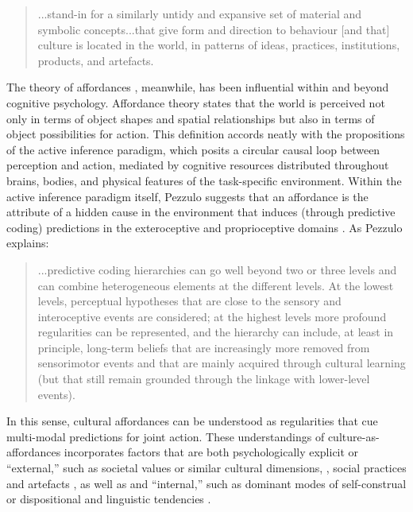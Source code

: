 \begin{CJK}{UTF8}{gbsn}
\begin{quote}
  ...stand-in for a similarly untidy and expansive set of material and symbolic concepts...that give form and direction to behaviour [and that] culture is located in the world, in patterns of ideas, practices, institutions, products, and artefacts.
\end{quote}

The theory of affordances \citep{Gibson1979}, meanwhile, has been influential within and beyond cognitive psychology.  Affordance theory states that the world is perceived not only in terms of object shapes and spatial relationships but also in terms of object possibilities for action.  This definition accords neatly with the propositions of the active inference paradigm, which posits a circular causal loop between perception and action, mediated by cognitive resources distributed throughout brains, bodies, and physical features of the task-specific environment.  Within the active inference paradigm itself, Pezzulo suggests that an affordance is the attribute of a hidden cause in the environment that induces (through predictive coding) predictions in the exteroceptive and proprioceptive domains \citep[908]{Pezzulo2013}.  As Pezzulo explains:

    \begin{quote}
    ...predictive coding hierarchies can go well beyond two or three levels and can combine heterogeneous elements at the different levels.  At the lowest levels, perceptual hypotheses that are close to the sensory and interoceptive events are considered; at the highest levels more profound regularities can be represented, and the hierarchy can include, at least in principle, long-term beliefs that are increasingly more removed from sensorimotor events and that are mainly acquired through cultural learning (but that still remain grounded through the linkage with lower-level events).
    \end{quote}

In this sense, cultural affordances can be understood as regularities that cue multi-modal predictions for joint action.  These understandings of culture-as-affordances incorporates factors that are both psychologically explicit or ``external,'' such as societal values or similar cultural dimensions, \citep{Hofstede1991,Schwartz1992}, social practices and artefacts  \citep{Nisbett2003a}, as well as and ``internal,'' such as dominant modes of self-construal or dispositional and linguistic tendencies \citep{Markus1991}.



\end{CJK}
